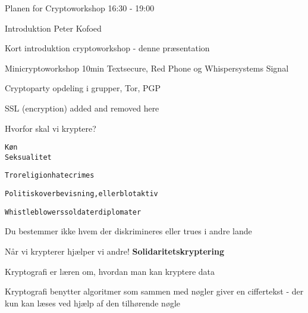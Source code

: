 \documentclass[20pt,landscape,a4paper,footrule]{foils}
\begin{document}



Planen for Cryptoworkshop 16:30 - 19:00
\begin{list2}
\item Introduktion Peter Kofoed
\item Kort introduktion cryptoworkshop - denne præsentation
\item Minicryptoworkshop 10min Textsecure, Red Phone og Whispersystems Signal
\item Cryptoparty opdeling i grupper, Tor, PGP
\end{list2}


\centerline{SSL (encryption) added and removed here}




Hvorfor skal vi kryptere?

\begin{alltt}
       Køn
                       Seksualitet

 Tro religion       hatecrimes

 Politisk overbevisning, eller blot aktiv

 Whistleblowers             soldater      diplomater

\end{alltt}

\centerline{Du bestemmer ikke hvem der diskrimineres eller trues i andre lande}

\vskip2cm

Når vi krypterer hjælper vi andre! {\bf Solidaritetskryptering}



\begin{list1}
\item Kryptografi er læren om, hvordan man kan kryptere data
\item Kryptografi benytter algoritmer som sammen med nøgler giver en
  ciffertekst - der kun kan læses ved hjælp af den tilhørende nøgle
\end{list1}
\end{document}
